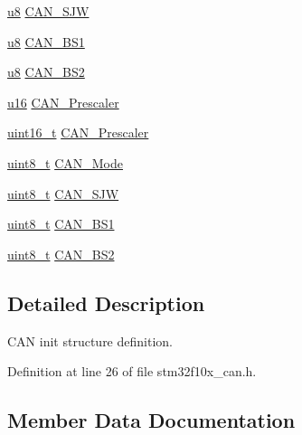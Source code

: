 \begin{DoxyCompactItemize}
\item 
\hyperlink{agilefox_2library_2inc_2stm32f10x__type_8h_aed742c436da53c1080638ce6ef7d13de}{u8} \hyperlink{struct_c_a_n___init_type_def_af3349cf58963dc25cadb34cf8367418a}{C\+A\+N\+\_\+\+S\+JW}
\item 
\hyperlink{agilefox_2library_2inc_2stm32f10x__type_8h_aed742c436da53c1080638ce6ef7d13de}{u8} \hyperlink{struct_c_a_n___init_type_def_aac04e12079df3ecd4fdbc5a77793bc2d}{C\+A\+N\+\_\+\+B\+S1}
\item 
\hyperlink{agilefox_2library_2inc_2stm32f10x__type_8h_aed742c436da53c1080638ce6ef7d13de}{u8} \hyperlink{struct_c_a_n___init_type_def_afb75a15badb26140497ef75f682572aa}{C\+A\+N\+\_\+\+B\+S2}
\item 
\hyperlink{agilefox_2library_2inc_2stm32f10x__type_8h_a9e6c91d77e24643b888dbd1a1a590054}{u16} \hyperlink{struct_c_a_n___init_type_def_a6b48cdffcbfa0a2555cf4608feea91bf}{C\+A\+N\+\_\+\+Prescaler}
\item 
\hyperlink{_p_e___types_8h_a1f1825b69244eb3ad2c7165ddc99c956}{uint16\+\_\+t} \hyperlink{struct_c_a_n___init_type_def_a3e91dbcbf30b893a9bd6a65606cb8fe9}{C\+A\+N\+\_\+\+Prescaler}
\item 
\hyperlink{_p_e___types_8h_aba7bc1797add20fe3efdf37ced1182c5}{uint8\+\_\+t} \hyperlink{struct_c_a_n___init_type_def_a24816ff18ae048a5ec4bbb22aa2c04f9}{C\+A\+N\+\_\+\+Mode}
\item 
\hyperlink{_p_e___types_8h_aba7bc1797add20fe3efdf37ced1182c5}{uint8\+\_\+t} \hyperlink{struct_c_a_n___init_type_def_addac271c43490cb37ac7293f7bf201c2}{C\+A\+N\+\_\+\+S\+JW}
\item 
\hyperlink{_p_e___types_8h_aba7bc1797add20fe3efdf37ced1182c5}{uint8\+\_\+t} \hyperlink{struct_c_a_n___init_type_def_aecbd21b55dc88c3a18db93af2836cd58}{C\+A\+N\+\_\+\+B\+S1}
\item 
\hyperlink{_p_e___types_8h_aba7bc1797add20fe3efdf37ced1182c5}{uint8\+\_\+t} \hyperlink{struct_c_a_n___init_type_def_a693eb00830d6e2aeb4d9fabdba85b9cf}{C\+A\+N\+\_\+\+B\+S2}
\end{DoxyCompactItemize}


\subsection{Detailed Description}
C\+AN init structure definition. 

Definition at line 26 of file stm32f10x\+\_\+can.\+h.



\subsection{Member Data Documentation}
